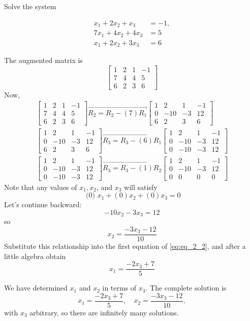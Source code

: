 \documentclass[../main.tex]{subfiles}
\begin{document}
\begin{example} Solve the system

\begin{align}
\label{eq:eq_2_2}
x_{1}+2 x_{2}+x_{3} &=-1,\nonumber \\
7 x_{1}+4 x_{2}+4 x_{3} &=5 \\
x_{1}+2 x_{2}+3 x_{3} &=6\nonumber
\end{align}

The augmented matrix is
$$
\left[\begin{array}{ccc|c}
1 & 2 & 1 & -1 \\
7 & 4 & 4 & 5 \\
6 & 2 & 3 & 6
\end{array}\right]
$$
Now,
$$
\begin{array}{l}
{\left[\begin{array}{ccc|c}
	1 & 2 & 1 & -1 \\
	7 & 4 & 4 & 5 \\
	6 & 2 & 3 & 6
	\end{array}\right] \overrightarrow{R_{2}=R_{2}-(7) R_{1}}\left[\begin{array}{ccc|c}
	1 & 2 & 1 & -1 \\
	0 & -10 & -3 & 12 \\
	6 & 2 & 3 & 6
	\end{array}\right]} \\
{\left[\begin{array}{ccc|c}
	1 & 2 & 1 & -1 \\
	0 & -10 & -3 & 12 \\
	6 & 2 & 3 & 6
	\end{array}\right] \overrightarrow{R_{3}=R_{3}-(6) R_{1}}\left[\begin{array}{cccc}
	1 & 2 & 1 & -1 \\
	0 & -10 & -3 & 12 \\
	0 & -10 & -3 & 12
	\end{array}\right]} \\
{\left[\begin{array}{ccc|c}
	1 & 2 & 1 & -1 \\
	0 & -10 & -3 & 12 \\
	0 & -10 & -3 & 12
	\end{array}\right] \overrightarrow{R_{3}=R_{3}-(1) R_{2}}\left[\begin{array}{ccc|c}
	1 & 2 & 1 & -1 \\
	0 & -10 & -3 & 12 \\
	0 & 0 & 0 & 0
	\end{array}\right]}
\end{array}
$$
Note that any values of $x_{1}, x_{2}$, and $x_{3}$ will satisfy
$$
\text { (0) } x_{1}+(0) x_{2}+(0) x_{3}=0
$$
Let's continue backward:
$$
-10 x_{2}-3 x_{3}=12
$$
so
$$
x_{2}=\frac{-3 x_{3}-12}{10}
$$
Substitute this relationship into the first equation of \ref{eq:eq_2_2}, and after a little algebra obtain
$$
x_{1}=\frac{-2 x_{3}+7}{5}
$$



We have determined $x_{1}$ and $x_{2}$ in terms of $x_{3}$. The complete solution is
$$
x_{1}=\frac{-2 x_{3}+7}{5}, \quad x_{2}=\frac{-3 x_{3}-12}{10},
$$
with $x_{3}$ arbitrary, so there are infinitely many solutions.
\end{example}
\end{document}
